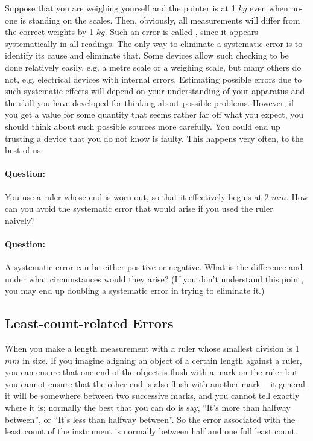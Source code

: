 Suppose that you are weighing yourself and the pointer is at 1 $kg$ even when no-one is standing on the scales. Then, obviously, all measurements will differ from the correct weights by 1 $kg$. Such an error is called , since it appears systematically in all readings. The only way to eliminate a systematic error is to identify its cause and eliminate that. Some devices allow such checking to be done relatively easily, e.g. a metre scale or a weighing scale, but many others do not, e.g. electrical devices with internal errors. Estimating possible errors due to such systematic effects will depend on your understanding of your apparatus and the skill you have developed for thinking about possible problems.  However, if you get a value for some quantity that seems rather far off what you expect, you should think about such possible sources more carefully. You could end up trusting a device that you do not know is faulty. This happens very often, to the best of us. 

\begin{question}
\paragraph{Question:} You use a ruler whose end is worn out, so that it effectively begins at 2 $mm$. How can you avoid the systematic error that would arise if you used the ruler naively?~\\


\paragraph{Question:} A systematic error can be either positive or negative. What is the difference and under what circumstances would they arise? (If you don't understand this point, you may end up doubling a systematic error in trying to eliminate it.)
\end{question}

\subsection{Least-count-related Errors}

When you make a length measurement with a ruler whose smallest division is 1 $mm$ in size. If you imagine aligning an object of a certain length against a ruler, you can ensure that one end of the object is flush with a mark on the ruler but you cannot ensure that the other end is also flush with another mark -- it general it will be somewhere between two successive marks, and you cannot tell exactly where it is; normally the best that you can do is say, ``It's more than halfway between'', or ``It's less than halfway between''. So the error associated with the least count of the instrument is normally between half and one full least count. 

